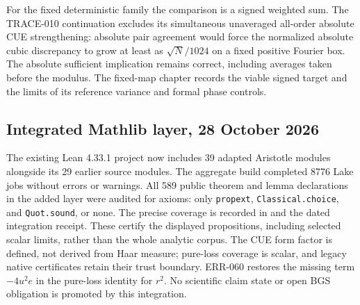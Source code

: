 For the fixed deterministic family the comparison is a signed weighted
sum. The TRACE-010 continuation excludes its simultaneous unaveraged
all-order absolute CUE strengthening: absolute pair agreement would force
the normalized absolute cubic discrepancy to grow at least as
$\sqrt N/1024$ on a fixed positive Fourier box. The absolute sufficient
implication remains correct, including averages taken before the modulus.
The fixed-map chapter records the viable signed target and the limits
of its reference variance and formal phase controls.

\subsection{Integrated Mathlib layer, 28 October 2026}
The existing Lean 4.33.1 project now includes 39 adapted Aristotle modules
alongside its 29 earlier source modules. The aggregate build completed
8776 Lake jobs without errors or warnings. All 589 public theorem and lemma
declarations in the added layer were audited for axioms: only
\texttt{propext}, \texttt{Classical.choice}, and \texttt{Quot.sound}, or none.
The precise coverage is recorded in 
and the dated integration receipt. These certify the displayed propositions,
including selected scalar limits, rather than the whole analytic corpus.
The CUE form factor is defined, not derived from Haar measure; pure-loss
coverage is scalar, and legacy native certificates retain their trust boundary.
ERR-060 restores the missing term $-4u^2e$ in the pure-loss identity for $r^2$.
No scientific claim state or open BGS obligation is promoted by this integration.
